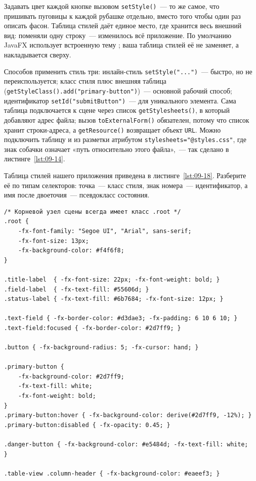 Задавать цвет каждой кнопке вызовом \texttt{setStyle()}~--- то же самое, что
пришивать пуговицы к каждой рубашке отдельно, вместо того чтобы один раз описать
фасон. Таблица стилей даёт единое место, где хранится весь внешний вид: поменяли
одну строку~--- изменилось всё приложение. По умолчанию JavaFX использует
встроенную тему ; ваша таблица стилей её не заменяет, а
накладывается сверху.

Способов применить стиль три: инлайн-стиль \texttt{setStyle("...")}~--- быстро,
но не переиспользуется; класс стиля плюс внешняя таблица
(\texttt{getStyleClass().add("primary-button")})~--- основной рабочий способ;
идентификатор \texttt{setId("submitButton")}~--- для уникального элемента. Сама
таблица подключается к сцене через список \texttt{getStylesheets()}, в который
добавляют адрес файла; вызов \texttt{toExternalForm()} обязателен, потому что
список хранит строки-адреса, а \texttt{getResource()} возвращает объект
\texttt{URL}. Можно подключить таблицу и из разметки атрибутом
\texttt{stylesheets="@styles.css"}, где знак собачки означает «путь относительно
этого файла»,~--- так сделано в листинге~\ref{lst:09-14}.

Таблица стилей нашего приложения приведена в листинге~\ref{lst:09-18}. Разберите
её по типам селекторов: точка~--- класс стиля, знак номера~--- идентификатор, а
имя после двоеточия~--- псевдокласс состояния.

\begin{listing}[H]
\begin{verbatim}
/* Корневой узел сцены всегда имеет класс .root */
.root {
    -fx-font-family: "Segoe UI", "Arial", sans-serif;
    -fx-font-size: 13px;
    -fx-background-color: #f4f6f8;
}

.title-label  { -fx-font-size: 22px; -fx-font-weight: bold; }
.field-label  { -fx-text-fill: #55606d; }
.status-label { -fx-text-fill: #6b7684; -fx-font-size: 12px; }

.text-field { -fx-border-color: #d3dae3; -fx-padding: 6 10 6 10; }
.text-field:focused { -fx-border-color: #2d7ff9; }

.button { -fx-background-radius: 5; -fx-cursor: hand; }

.primary-button {
    -fx-background-color: #2d7ff9;
    -fx-text-fill: white;
    -fx-font-weight: bold;
}
.primary-button:hover { -fx-background-color: derive(#2d7ff9, -12%); }
.primary-button:disabled { -fx-opacity: 0.45; }

.danger-button { -fx-background-color: #e5484d; -fx-text-fill: white; }

.table-view .column-header { -fx-background-color: #eaeef3; }
\end{verbatim}
\caption{Таблица стилей styles.css}
\label{lst:09-18}
\end{listing}

